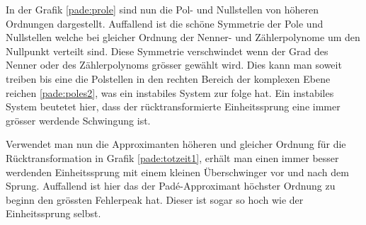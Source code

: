 In der Grafik \ref{pade:prole} sind nun die Pol- und Nullstellen von höheren Ordnungen dargestellt. 
Auffallend ist die schöne Symmetrie der Pole und Nullstellen welche bei gleicher Ordnung der Nenner- und Zählerpolynome um den Nullpunkt verteilt sind.
Diese Symmetrie verschwindet wenn der Grad des Nenner oder des Zählerpolynoms grösser gewählt wird.
Dies kann man soweit treiben bis eine die Polstellen in den rechten Bereich der komplexen Ebene reichen \ref{pade:poles2},
was ein instabiles System zur folge hat.
Ein instabiles System beutetet hier, dass der rücktransformierte Einheitssprung eine immer grösser werdende Schwingung ist.
 
\begin{figure}
	\centering
\end{figure}
Verwendet man nun die Approximanten höheren und gleicher Ordnung für die Rücktransformation in Grafik \ref{pade:totzeit1}, erhält man einen immer besser werdenden Einheitssprung mit einem kleinen Überschwinger vor und nach dem Sprung. 
Auffallend ist hier das der Padé-Approximant höchster Ordnung zu beginn den grössten Fehlerpeak hat.
Dieser ist sogar so hoch wie der Einheitssprung selbst.

